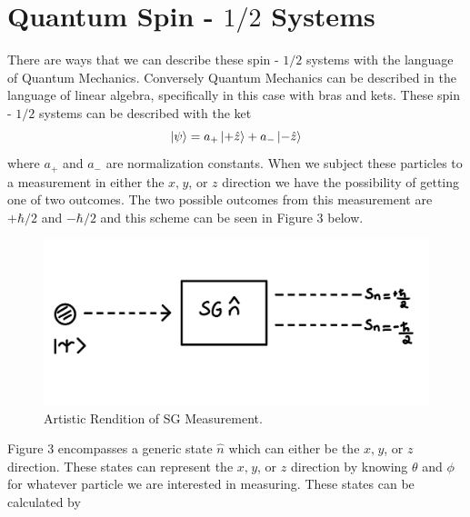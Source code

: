 \documentclass[twocolumn]{article}
\begin{document}
\section*{Quantum Spin - $1/2$ Systems}
There are ways that we can describe these spin - $1/2$ systems with the language of Quantum Mechanics. Conversely Quantum Mechanics can be described in the language of linear algebra, specifically in this case with bras and kets. These spin - $1/2$ systems can be described with the ket 
\begin{equation}
\ket{\psi}=a_{+}\ket{+\hat{z}}+a_{-}\ket{-\hat{z}}
\end{equation}
where $a_{+}$ and $a_{-}$ are normalization constants. When we subject these particles to a measurement in either the $x, \hspace{1pt} y$, or $z$ direction we have the possibility of getting one of two outcomes. The two possible outcomes from this measurement are $+\hbar/2$ and $-\hbar/2$ and this scheme can be seen in Figure 3 below. \\
\begin{figure}[htpb]
\begin{center}
\includegraphics[width=0.90\linewidth]{SG-Measurement.PNG}
\caption{Artistic Rendition of SG Measurement.}
\end{center}
\end{figure}
\newline
Figure 3 encompasses a generic state $\hat{n}$ which can either be the $x, \hspace{1pt} y$, or $z$ direction. These states can represent the $x, \hspace{1pt} y$, or $z$ direction by knowing $\theta$ and $\phi$ for whatever particle we are interested in measuring. These states can be calculated by
\end{document}

